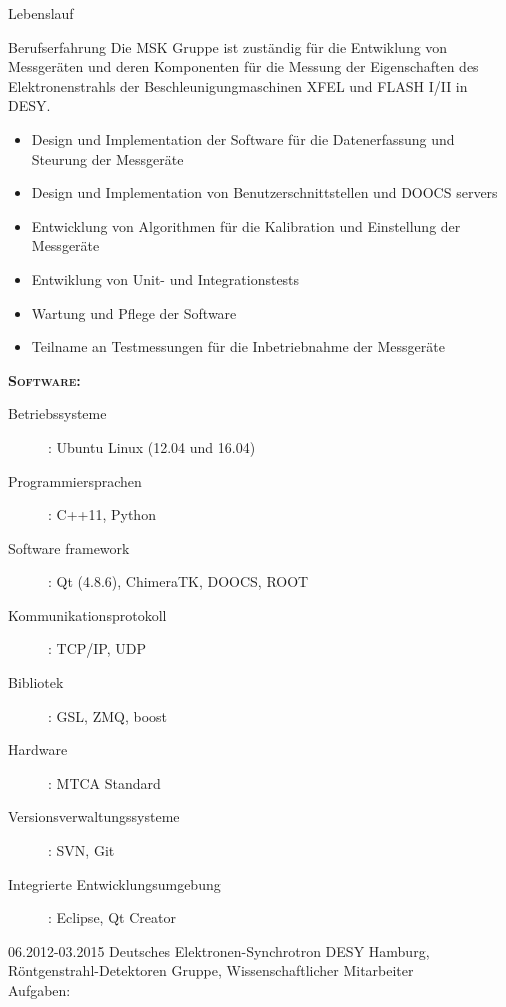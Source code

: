 \documentclass[11pt,a4paper]{scrartcl}
\begin{document}
\begin{cv}{Lebenslauf}
\begin{cvlist}{Berufserfahrung}
Die MSK Gruppe ist zust{\"a}ndig f{\"u}r die Entwiklung von Messger{\"a}ten und
deren Komponenten f{\"u}r die Messung der Eigenschaften des Elektronenstrahls
der Beschleunigungmaschinen XFEL und FLASH I/II in DESY.
\begin{itemize}
  \item Design und Implementation der Software f{\"u}r die Datenerfassung und
  Steurung der Messger{\"a}te
  \item Design und Implementation von Benutzerschnittstellen und DOOCS servers
  \item Entwicklung von Algorithmen f{\"u}r die Kalibration und
  Einstellung der Messger{\"a}te
  \item Entwiklung von Unit- und Integrationstests
  \item Wartung und Pflege der Software
  \item Teilname an Testmessungen f{\"u}r die Inbetriebnahme der Messger{\"a}te
\end{itemize}
{\scshape {\bfseries Software:}}
\begin{description}
\item[Betriebssysteme] : Ubuntu Linux (12.04 und 16.04)
\item[Programmiersprachen] : C++11, Python
\item[Software framework] : Qt (4.8.6), ChimeraTK, DOOCS, ROOT
\item[Kommunikationsprotokoll] : TCP/IP, UDP
\item[Bibliotek] : GSL, ZMQ, boost
\item[Hardware] : MTCA Standard
\item[Versionsverwaltungssysteme] : SVN, Git
\item[Integrierte Entwicklungsumgebung] : Eclipse, Qt Creator
\end{description}

\vspace{\baselineskip}

\item[06.2012-03.2015] Deutsches Elektronen-Synchrotron DESY Hamburg,
R{\"o}ntgenstrahl-Detektoren Gruppe, Wissenschaftlicher Mitarbeiter\\

Aufgaben:\\


\end{cvlist}
\end{cv}
\end{document}
